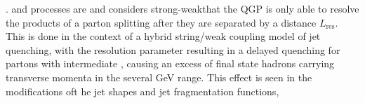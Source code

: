 

.  and processes are  and considers strong-weakthat the QGP is only able to resolve the products of a parton splitting after they are separated by a distance $L_{\mathrm{res}}$. This is done in the context of a hybrid string/weak coupling model of jet quenching, with the resolution parameter resulting in a delayed quenching for partons with intermediate \pt, causing an excess of final state hadrons carrying transverse momenta in the several GeV range. This effect is seen in the modifications oft he jet shapes and jet fragmentation functions, 












